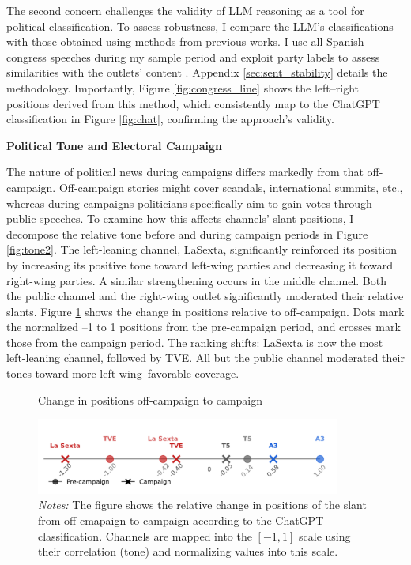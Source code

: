 \documentclass[12pt]{article}
\begin{document}
The second concern challenges the validity of LLM reasoning as a tool for political classification. To assess robustness, I compare the LLM’s classifications with those obtained using methods from previous works. I use all Spanish congress speeches during my sample period and exploit party labels to assess similarities with the outlets’ content \citep{gentzkow2010media,laver2003extracting}. Appendix \ref{sec:sent_stability} details the methodology. Importantly, Figure \ref{fig:congress_line} shows the left–right positions derived from this method, which consistently map to the ChatGPT classification in Figure \ref{fig:chat}, confirming the approach’s validity.

\textbf{Political Tone and Electoral Campaign}

The nature of political news during campaigns differs markedly from that off-campaign. Off-campaign stories might cover scandals, international summits, etc., whereas during campaigns politicians specifically aim to gain votes through public speeches. To examine how this affects channels’ slant positions, I decompose the relative tone before and during campaign periods in Figure \ref{fig:tone2}. The left-leaning channel, LaSexta, significantly reinforced its position by increasing its positive tone toward left-wing parties and decreasing it toward right-wing parties. A similar strengthening occurs in the middle channel. Both the public channel and the right-wing outlet significantly moderated their relative slants. Figure \ref{fig:change_line} shows the change in positions relative to off-campaign. Dots mark the normalized –1 to 1 positions from the pre-campaign period, and crosses mark those from the campaign period. The ranking shifts: LaSexta is now the most left-leaning channel, followed by TVE. All but the public channel moderated their tones toward more left-wing–favorable coverage.



\begin{figure}[ht!]
	\centering
	\caption{Change in positions off-campaign to campaign}
	\includegraphics[width=100mm]{figures/congress_line_chatgpt_pre_post}
	
	\caption*{\small \textit{Notes:} The figure shows the relative change in  positions of the slant from off-cmapaign to campaign according to the ChatGPT classification. 			Channels are mapped into the $[-1,1]$ scale using their correlation (tone) and normalizing values into this scale. }
	\label{fig:change_line}
\end{figure}
\end{document}
